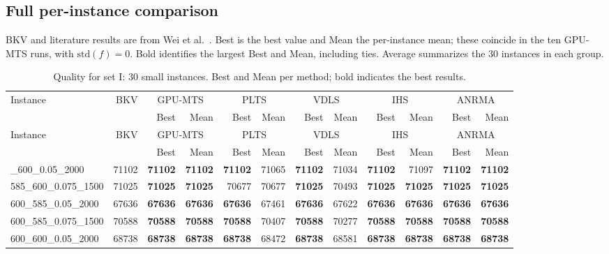 \begin{landscape}
\setlength{\LTcapwidth}{\linewidth}
\section{Full per-instance comparison}
\label{app:full-results}
{BKV and literature results are from Wei et al.~\cite{Wei2026ANRMA}. Best is the best value and Mean the per-instance mean; these coincide in the ten GPU-MTS runs, with $\mathrm{std}(f)=0$. Bold identifies the largest Best and Mean, including ties. Average summarizes the 30 instances in each group.}
\begingroup\fontsize{9}{10.5}\selectfont\setlength{\tabcolsep}{2.5pt}\renewcommand{\arraystretch}{.88}
\begin{longtable}{lrrrrrrrrrrr}
\caption{{Quality for set I: 30 small instances. Best and Mean per method; bold indicates the best results.}}\label{tab:full-c1}\\
\toprule
Instance & BKV & \multicolumn{2}{c}{GPU-MTS} & \multicolumn{2}{c}{PLTS} & \multicolumn{2}{c}{VDLS} & \multicolumn{2}{c}{IHS} & \multicolumn{2}{c}{ANRMA}\\
 &  & Best & Mean & Best & Mean & Best & Mean & Best & Mean & Best & Mean\\
\midrule\endfirsthead
Instance & BKV & \multicolumn{2}{c}{GPU-MTS} & \multicolumn{2}{c}{PLTS} & \multicolumn{2}{c}{VDLS} & \multicolumn{2}{c}{IHS} & \multicolumn{2}{c}{ANRMA}\\
 &  & Best & Mean & Best & Mean & Best & Mean & Best & Mean & Best & Mean\\
\midrule\endhead
\bottomrule\endlastfoot
585\_600\_0.05\_2000 & 71102 & \textbf{71102} & \textbf{71102} & \textbf{71102} & 71065 & \textbf{71102} & 71034 & \textbf{71102} & 71097 & \textbf{71102} & \textbf{71102}\\
585\_600\_0.075\_1500 & 71025 & \textbf{71025} & \textbf{71025} & 70677 & 70677 & \textbf{71025} & 70493 & \textbf{71025} & \textbf{71025} & \textbf{71025} & \textbf{71025}\\
600\_585\_0.05\_2000 & 67636 & \textbf{67636} & \textbf{67636} & \textbf{67636} & 67461 & \textbf{67636} & 67622 & \textbf{67636} & \textbf{67636} & \textbf{67636} & \textbf{67636}\\
600\_585\_0.075\_1500 & 70588 & \textbf{70588} & \textbf{70588} & \textbf{70588} & 70407 & \textbf{70588} & 70277 & \textbf{70588} & \textbf{70588} & \textbf{70588} & \textbf{70588}\\
600\_600\_0.05\_2000 & 68738 & \textbf{68738} & \textbf{68738} & \textbf{68738} & 68472 & \textbf{68738} & 68581 & \textbf{68738} & \textbf{68738} & \textbf{68738} & \textbf{68738}\\

\end{longtable}
\end{landscape}
